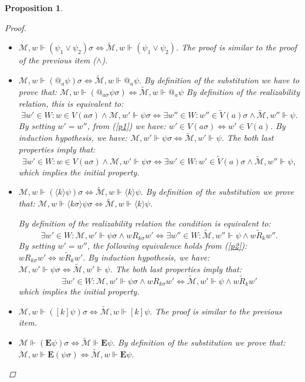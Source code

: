 \documentclass{eptcs}
\newtheorem{proposition}{Proposition}
\newcommand{\A}[1]{[{#1}]}
\newcommand{\E}[1]{\langle{#1}\rangle}
\newcounter{ti}
\begin{document}
\begin{proposition}
\begin{proof}
\begin{itemize}
\item $\mathcal{M},w \Vdash (\psi_1 \lor \psi_2)\sigma \iff \mathcal{\tilde M},w \Vdash (\psi_1 \lor \psi_2)$. The proof is similar to the proof of the previous item ($\land$).

\item $\mathcal{M},w \Vdash (@_a\psi )\sigma \iff \mathcal{\tilde M},w \Vdash @_a \psi.$
By definition of the substitution we have to prove that: 
$\mathcal{M},w \Vdash (@_{a\sigma} \psi\sigma ) \iff \mathcal{\tilde M},w \Vdash @_a \psi $
By definition of the realizability relation, this is equivalent to:
$$\exists w' \in W: w \in V(a\sigma) \land \mathcal M,w' \Vdash \psi \sigma \iff \exists w'' \in W: w'' \in \tilde V(a)\sigma \land \mathcal{\tilde M},w'' \Vdash \psi.$$
By setting $w'=w''$, from (\ref{p1}) we have: $w' \in V(a \sigma) \iff w' \in V(a)$.
By induction hypothesis, we have: $\mathcal M,w' \Vdash \psi \sigma \iff \mathcal{\tilde M},w' \Vdash \psi.$
The both last properties imply that:
$$\exists w' \in W: w \in V(a\sigma) \land \mathcal M,w' \Vdash \psi \sigma \iff \exists w' \in W: w' \in \tilde V(a)\sigma \land \mathcal{\tilde M},w'' \Vdash \psi,$$
which implies the initial property.

\item $\mathcal{M},w \Vdash (\E{k}\psi )\sigma \iff \mathcal{\tilde M},w \Vdash \E{k}\psi.$
By definition of the substitution we prove that:
$\mathcal{M},w \Vdash \E{k\sigma} \psi\sigma \iff \mathcal{\tilde M},w \Vdash \E{k}\psi.$

By definition of the realizability relation the condition is equivalent to:
$$\exists w' \in W: {\mathcal M}, w' \Vdash \psi\sigma \land w R_{k\sigma} w' \iff \exists w'' \in W: \mathcal{\tilde M}, w'' \Vdash \psi \land w \tilde R_k w''.$$
 By setting $w'=w''$, the following equivalence holds from (\ref{p2}): $w R_{k \sigma} w' \iff w \tilde R_{k} w'$. By induction hypothesis, we have: ${\mathcal M}, w' \Vdash \psi\sigma \iff \mathcal{\tilde M}, w' \Vdash \psi$.
The both last properties imply that:
$$\exists w' \in W: {\mathcal M}, w' \Vdash \psi\sigma \land w R_{k\sigma} w' \iff \mathcal{\tilde M}, w' \Vdash \psi \land w \tilde R_k w'$$ 
which implies the initial property.

\item $\mathcal{M},w \Vdash (\A{k}\psi )\sigma \iff \mathcal{\tilde M},w \Vdash \A{k}\psi.$ The proof is similar to the previous item.
\item $\mathcal M \Vdash (\textbf{E} \psi) \sigma \iff \mathcal {\tilde M} \Vdash \textbf {E} \psi.$
By definition of the substitution we prove that: 
$\mathcal M,w \Vdash \textbf {E} (\psi \sigma) \iff \mathcal {\tilde M},w \Vdash \textbf {E} \psi.$


\end{itemize}
\end{proof}
\end{proposition}
\end{document}
